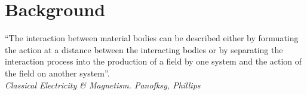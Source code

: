 \chapter{Background}
\begin{center}
  \begin{minipage}{0.75\textwidth}
    \begin{small}
      “The interaction between material bodies can be described either by formuating the action at a distance between the interacting bodies or by separating the interaction process into the production of a field by one system and the action of the field on another system”. \\
      \null\hfill\emph{Classical Electricity \& Magnetism. Panofksy, Phillips}
    \end{small}
  \end{minipage}
  \vspace{0.5cm}
\end{center}





